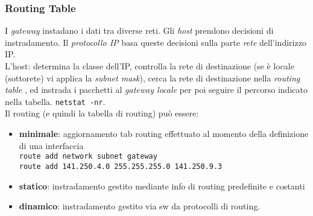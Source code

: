 \documentclass[a4paper,11pt]{article}
\def\code#1{\texttt{#1}}
\begin{document}
 \subsubsection{Routing Table}
  I \textit{gateway} instadano i dati tra diverse reti. Gli \textit{host} prendono decisioni di instradamento. Il \textit{protocollo IP} basa queste decisioni sulla parte \textit{rete} dell'indirizzo IP.\\
 L'host: determina la classe dell'IP, controlla la rete di destinazione (se è locale (sottorete) vi applica la \textit{subnet mask}), cerca la rete di destinazione nella \textit{routing table} , ed instrada i pacchetti al \textit{gateway locale} per poi seguire il percorso indicato nella tabella. \code{netstat -nr}.\\
Il routing (e quindi la tabella di routing) può essere:
\begin{itemize}
\item\textbf{minimale}: aggiornamento tab routing effettuato al momento della definizione di una interfaccia\\
\code{route add network subnet gateway \\
route add 141.250.4.0 255.255.255.0 141.250.9.3 }
\item\textbf{statico}: instradamento gestito mediante info di routing predefinite e costanti
\item\textbf{dinamico}: instradamento gestito via sw da protocolli di routing.
\end{itemize}
\end{document}
